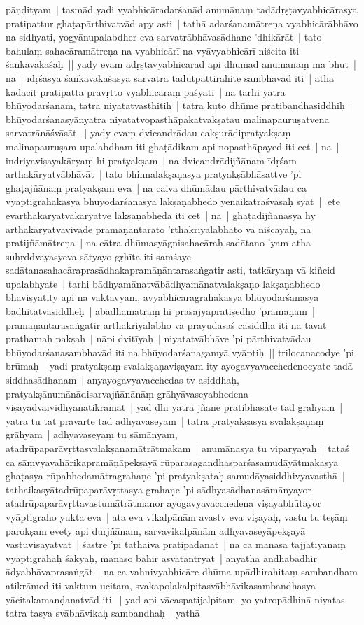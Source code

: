 \documentclass[article,12pt,a4paper]{memoir}
\newcommand{\persName}[1]{#1}
\begin{document}
pāṇḍityam | tasmād yadi vyabhicāradarśanād anumānaṃ tadādṛṣṭavyabhicārasya pratipattur ghaṭapārthivatvād apy asti | tathā adarśanamātreṇa vyabhicārābhāvo na sidhyati, yogyānupalabdher eva sarvatrābhāvasādhane 'dhikārāt | tato bahulaṃ sahacāramātreṇa na vyabhicārī na vyāvyabhicārī niścita iti śaṅkāvakāśaḥ || \label{thakur75-108.25} yady evam adṛṣṭavyabhicārād api dhūmād anumānaṃ mā bhūt | na | īdṛśasya śaṅkāvakāśasya sarvatra tadutpattirahite sambhavād iti | atha kadācit pratipattā pravṛtto vyabhicāraṃ paśyati | na tarhi yatra bhūyodarśanam, tatra niyatatvasthitiḥ | tatra kuto dhūme pratibandhasiddhiḥ | bhūyodarśanasyānyatra niyatatvopasthāpakatvakṣatau malinapauruṣatvena sarvatrānāśvāsāt || \label{thakur75-108.30} yady evaṃ dvicandrādau cakṣurādipratyakṣaṃ malinapauruṣam upalabdham iti ghaṭādikam api nopasthāpayed iti cet | na | indriyaviṣayakāryaṃ hi pratyakṣam | na dvicandrādijñānam īdṛśam arthakāryatvābhāvāt | tato bhinnalakṣaṇasya pratyakṣābhāsattve 'pi ghaṭajñānaṃ pratyakṣam eva | na caiva dhūmādau pārthivatvādau ca vyāptigrāhakasya bhūyodarśanasya lakṣaṇabhedo yenaikatrāśvāsaḥ syāt || \label{thakur75-109.4} ete evārthakāryatvākāryatve lakṣaṇabheda iti cet | na | ghaṭādijñānasya hy arthakāryatvavivāde pramāṇāntarato 'rthakriyālābhato vā niścayaḥ, na pratijñāmātreṇa | na cātra dhūmasyāgnisahacāraḥ sadātano 'yam atha suhṛddvayasyeva sātyayo gṛhīta iti saṃśaye sadātanasahacāraprasādhakapramāṇāntarasaṅgatir asti, tatkāryaṃ vā kiñcid upalabhyate | tarhi bādhyamānatvābādhyamānatvalakṣaṇo lakṣaṇabhedo bhaviṣyatīty api na vaktavyam, avyabhicāragrahākasya bhūyodarśanasya bādhitatvāsiddheḥ | abādhamātraṃ hi prasajyapratiṣedho 'pramāṇam | pramāṇāntarasaṅgatir arthakriyālābho vā prayudāsaś cāsiddha iti na tāvat prathamaḥ pakṣaḥ | nāpi dvitīyaḥ | niyatatvābhāve 'pi pārthivatvādau bhūyodarśanasambhavād iti na bhūyodarśanagamyā vyāptiḥ || \label{thakur75-109.13} \persName{trilocana}codye 'pi brūmaḥ | yadi pratyakṣaṃ svalakṣaṇaviṣayam ity ayogavyavacchedenocyate tadā siddhasādhanam | anyayogavyavacchedas tv asiddhaḥ, pratyakṣānumānādisarvajñānānāṃ grāhyāvaseyabhedena viṣayadvaividhyānatikramāt | yad dhi yatra jñāne pratibhāsate tad grāhyam | yatra tu tat pravarte tad adhyavaseyam | tatra pratyakṣasya svalakṣaṇaṃ grāhyam | adhyavaseyaṃ tu sāmānyam, atadrūpaparāvṛttasvalakṣaṇamātrātmakam | anumānasya tu viparyayaḥ | tataś ca sāṃvyavahārikapramāṇāpekṣayā rūparasagandhasparśasamudāyātmakasya ghaṭasya rūpabhedamātragrahaṇe 'pi pratyakṣataḥ samudāyasiddhivyavasthā | tathaikasyātadrūpaparāvṛttasya grahaṇe 'pi sādhyasādhanasāmānyayor atadrūpaparāvṛttavastumātrātmanor ayogavyavacchedena viṣayabhūtayor vyāptigraho yukta eva | ata eva vikalpānām avastv eva viṣayaḥ, vastu tu teṣāṃ parokṣam evety api durjñānam, sarvavikalpānām adhyavaseyāpekṣayā vastuviṣayatvāt | śāstre 'pi tathaiva pratipādanāt | na ca manasā tajjātīyānāṃ vyāptigrahaḥ śakyaḥ, manaso bahir asvātantryāt | anyathā andhabadhir ādyabhāvaprasaṅgāt | na ca vahnivyabhicāre dhūma upādhirahitaṃ sambandham atikrāmed iti vaktum ucitam, svakapolakalpitasvābhāvikasambandhasya yācitakamaṇḍanatvād iti || \label{thakur75-109.27} yad api vācaspatijalpitam, yo yatropādhinā niyatas tatra tasya svābhāvikaḥ sambandhaḥ | yathā 
\end{document}
